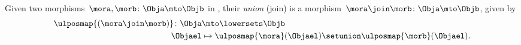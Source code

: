 \begin{definition}
    Given two morphisms~$\mora,\morb\colon \Obja \mto \Objb$ in \LPos, their \emph{union} (join) is a morphism~$\mora \join \morb \colon \Obja \mto \Objb$, given by
    \begin{equation*}
        \begin{aligned}
            \ulposmap{(\mora \join \morb)}\colon \Obja & \mto \lowersets \Objb                                                  \\
            \Objael                                    & \mapsto \ulposmap{\mora}(\Objael) \setunion \ulposmap{\morb}(\Objael).
        \end{aligned}
    \end{equation*}
\end{definition}

